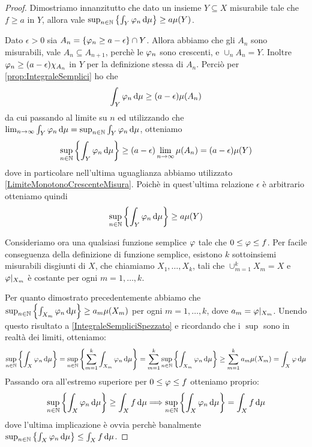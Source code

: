 \begin{proof}
	Dimostriamo innanzitutto che dato un insieme $Y\subseteq X$ misurabile tale che $f\ge a$ in $Y$, allora vale $\sup_{n\in\mathbb N}\left\{\int_Y\varphi_n\,\mathrm d\mu\right\}\ge a\mu(Y)$.
	
	Dato $\epsilon>0$ sia $A_n=\{\varphi_n\ge a-\epsilon\}\cap Y$. Allora abbiamo che gli $A_n$ sono misurabili, vale $A_n\subseteq A_{n+1}$, perchè le $\varphi_n$ sono crescenti, e $\cup_nA_n=Y$. Inoltre $\varphi_n\ge (a-\epsilon)\chi_{A_n}$ in $Y$ per la definizione stessa di $A_n$. Perciò per \cref{prop:IntegraleSemplici} ho che
	\begin{equation*}
		\int_Y\varphi_n\,\mathrm d\mu\ge(a-\epsilon)\mu(A_n)
	\end{equation*}
	da cui passando al limite su $n$ ed utilizzando che $\lim_{n\to\infty}\int_Y\varphi_n\,\mathrm d\mu=\sup_{n\in\mathbb N}\int_Y\varphi_n\,\mathrm d\mu$, otteniamo
	\begin{equation*}
		\sup_{n\in\mathbb N}\left\{\int_Y\varphi_n\,\mathrm d\mu\right\}\ge(a-\epsilon)\lim_{n\to\infty}\mu(A_n)=(a-\epsilon)\mu(Y)
	\end{equation*}
	dove in particolare nell'ultima uguaglianza abbiamo utilizzato \cref{LimiteMonotonoCrescenteMisura}. Poichè in quest'ultima relazione $\epsilon$ è arbitrario otteniamo quindi
	\begin{equation*}
		\sup_{n\in\mathbb N}\left\{\int_Y\varphi_n\,\mathrm d\mu\right\}\ge a\mu(Y)
	\end{equation*}

	Consideriamo ora una qualsiasi funzione semplice $\varphi$ tale che $0\le \varphi\le f$. Per facile conseguenza della definizione di funzione semplice, esistono $k$ sottoinsiemi misurabili disgiunti di $X$, che chiamiamo $X_1,\dots,X_k$, tali che $\cup_{m=1}^kX_m=X$ e $\varphi|_{X_m}$ è costante per ogni $m=1,\dots,k$.
	
	Per quanto dimostrato precedentemente abbiamo che $\sup_{n\in\mathbb N}\left\{\int_{X_m}\varphi_n\,\mathrm d\mu\right\}\ge a_m\mu(X_m)$ per ogni $m=1,\dots,k$, dove $a_m=\varphi|_{X_m}$. Unendo questo risultato a \cref{IntegraleSempliciSpezzato} e ricordando che i $\sup$ sono in realtà dei limiti, otteniamo:
	\begin{equation*}
		\sup_{n\in\mathbb N}\left\{\int_X\varphi_n\,\mathrm d\mu\right\}=\sup_{n\in\mathbb N}\left\{\sum_{m=1}^k \int_{X_m}\varphi_n\,\mathrm d \mu\right\}=\sum_{m=1}^k\sup_{n\in\mathbb N}\left\{ \int_{X_m}\varphi_n\,\mathrm d \mu\right\}\ge \sum_{m=1}^ka_m\mu(X_m)=\int_X\varphi\,\mathrm d\mu
	\end{equation*}
	Passando ora all'estremo superiore per $0\le \varphi \le f$ otteniamo proprio:
	\begin{equation*}
		\sup_{n\in\mathbb N}\left\{\int_X\varphi_n\,\mathrm d\mu\right\}\ge \int_X f \,\mathrm d\mu\Longrightarrow \sup_{n\in\mathbb N}\left\{\int_X\varphi_n\,\mathrm d\mu\right\}= \int_X f\,\mathrm d\mu
	\end{equation*}
	dove l'ultima implicazione è ovvia perchè banalmente $\sup_{n\in\mathbb N}\left\{\int_X\varphi_n\,\mathrm d\mu\right\}\le \int_X f\,\mathrm d\mu$.
\end{proof}


